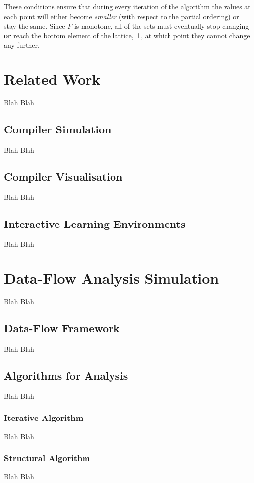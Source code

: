 \documentclass[bsc,twoside,singlespacing,parskip,logo,notimes,normalheadings]{infthesis}
\begin{document}
          These conditions ensure that during every iteration of the
          algorithm the values at each point will either become {\em
            smaller} (with respect to the partial ordering) or stay
          the same. Since $F$ is monotone, all of the sets must
          eventually stop changing {\bf or} reach the bottom element
          of the lattice, $\bot$, at which point they cannot change
          any further.


\chapter{Related Work}
Blah Blah

	\section{Compiler Simulation}
	Blah Blah

	\section{Compiler Visualisation}
	Blah Blah

	\section{Interactive Learning Environments}
	Blah Blah


\chapter{Data-Flow Analysis Simulation}
Blah Blah

	\section{Data-Flow Framework}
	Blah Blah

        \section{Algorithms for Analysis}
	Blah Blah

	\subsection{Iterative Algorithm}
	Blah Blah
    
    	\subsection{Structural Algorithm}
	Blah Blah
        
\end{document}
